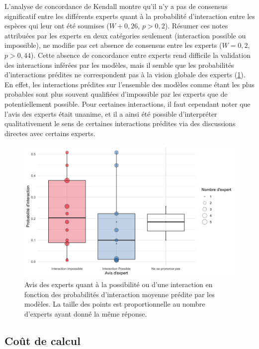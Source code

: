 \documentclass[12pt,]{article}
\makeatletter
\def\maxwidth{\ifdim\Gin@nat@width>\linewidth\linewidth
\else\Gin@nat@width\fi}
\let\Oldincludegraphics\includegraphics
\renewcommand{\includegraphics}[1]{\Oldincludegraphics[width=\maxwidth]{#1}}
\makeatother
\begin{document}
L'analyse de concordance de Kendall montre qu'il n'y a pas de consensus
significatif entre les différents experts quant à la probabilité
d'interaction entre les espèces qui leur ont été soumises (\(W + 0,26\),
\(p > 0,2\)). Résumer ces notes attribuées par les experts en deux
catégories seulement (interaction possible ou impossible), ne modifie
pas cet absence de consensus entre les experts (\(W = 0,2\),
\(p > 0,44\)). Cette absence de concordance entre experts rend difficile
la validation des interactions inférées par les modèles, mais il semble
que les probabilités d'interactions prédites ne correspondent pas à la
vision globale des experts (\cref{fig:expert}). En effet, les
interactions prédites sur l'ensemble des modèles comme étant les plus
probables sont plus souvent qualifiées d'impossible par les experts que
de potentiellement possible. Pour certaines interactions, il faut
cependant noter que l'avis des experts était unanime, et il a ainsi été
possible d'interpréter qualitativement le sens de certaines interactions
prédites via des discussions directes avec certains experts.

\begin{figure}
\hypertarget{fig:expert}{%
\centering
\includegraphics{figures/expert-option-2.png}
\caption{Avis des experts quant à la possibilité ou d'une interaction en
fonction des probabilités d'interaction moyenne prédite par les modèles.
La taille des points est proportionnelle au nombre d'experts ayant donné
la même réponse.}\label{fig:expert}
}
\end{figure}

\hypertarget{couxfbt-de-calcul}{%
\subsection{Coût de calcul}\label{couxfbt-de-calcul}}
\end{document}
